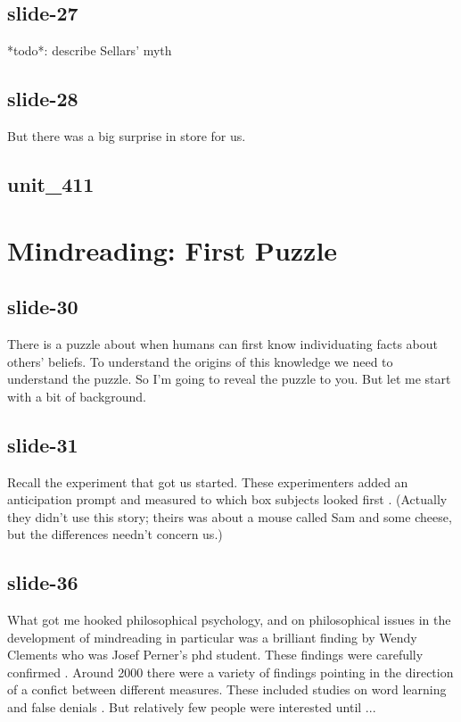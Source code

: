 \documentclass[12pt,\papersize]{extarticle}
\begin{document}
 
\subsection{slide-27}
*todo*: describe Sellars' myth
 
 
\subsection{slide-28}
But there was a big surprise in store for us.
 
 
\subsection{unit\_411}
 
\section{Mindreading: First Puzzle}
 
 
\subsection{slide-30}
There is a puzzle about when humans can first know individuating facts about others' beliefs.
To understand the origins of this knowledge we need to understand the puzzle.
So I'm going to reveal the puzzle to you. But let me start with a bit of background.
 
 
\subsection{slide-31}
Recall the experiment that got us started.
These experimenters added an anticipation prompt and measured to which box subjects looked first \citep{Clements:1994cw}.
(Actually they didn't use this story; theirs was about a mouse called Sam and some cheese, but the differences needn't concern us.)
 
 
\subsection{slide-36}
What got me hooked philosophical psychology, and on philosophical issues in the development of mindreading in particular was a brilliant finding by Wendy Clements who was Josef Perner's phd student.
These findings were carefully confirmed \citep{Clements:2000nc,Garnham:2001ql,Ruffman:2001ng}.
Around 2000 there were a variety of findings pointing in the direction of a confict between different measures.
These included studies on word learning \citep{Carpenter:2002gc,Happe:2002sr} and false denials \citep{Polak:1999xr}.
But relatively few people were interested until ...
 
\end{document}
